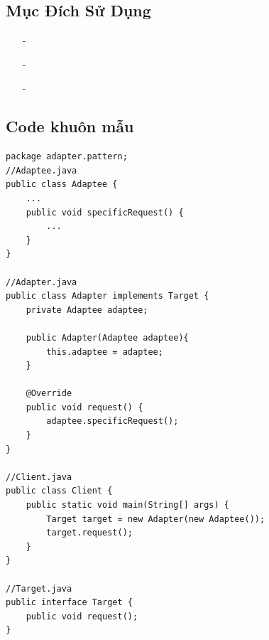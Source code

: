 \documentclass{article}
\newcommand\subpara{\fontsize{13}{13}\selectfont \fontseries{b}\selectfont}
\begin{document}
    \subsection{Mục Đích Sử Dụng}
    \begin{itemize}
        \item[-]\subpara{Chuyển đổi interface của một class thành interface mà client yêu cầu}
        \item[-]\subpara{Tạo ra những lớp có khả năng sử dụng lại, chúng phối hợp với các lớp không liên quan hay những lớp không thể đoán trước được và những lớp này không có interface tương thích}
        \item[-]\subpara{Khi muốn đảm bảo nguyên tắc Open/Close trong một ứng dụng}
    \end{itemize}


    \subsection{Code khuôn mẫu}
    \begin{lstlisting}
package adapter.pattern;
//Adaptee.java
public class Adaptee {
    ...
    public void specificRequest() {
        ...
    }
}

//Adapter.java
public class Adapter implements Target {
    private Adaptee adaptee;

    public Adapter(Adaptee adaptee){
        this.adaptee = adaptee;
    }

    @Override
    public void request() {
        adaptee.specificRequest();
    }
}

//Client.java
public class Client {
    public static void main(String[] args) {
        Target target = new Adapter(new Adaptee());
        target.request();
    }
}

//Target.java
public interface Target {
    public void request();
}
    \end{lstlisting}
\end{document}
